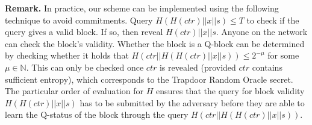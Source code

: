 \noindent
\textbf{Remark.}
In practice, our scheme can be implemented using the following technique to
avoid commitments. Query $H(H(ctr) || x || s) \leq T$ to check if the query gives
a valid block. If so, then reveal $H(ctr) || x || s$. Anyone on the network can
check the block's validity. Whether the block is a Q-block can be determined by
checking whether it holds that $H(ctr || H(H(ctr) || x || s)) \leq 2^{-\mu}$ for some
$\mu \in \mathbb{N}$.
This can only be checked once $ctr$ is revealed (provided $ctr$ contains
sufficient entropy), which corresponds to the Trapdoor Random Oracle secret.
The particular order of evaluation for $H$ ensures that the query for block
validity $H(H(ctr) || x || s)$ has to be submitted by the adversary before they
are able to learn the Q-status of the block through the query
$H(ctr || H(H(ctr) || x || s))$.
